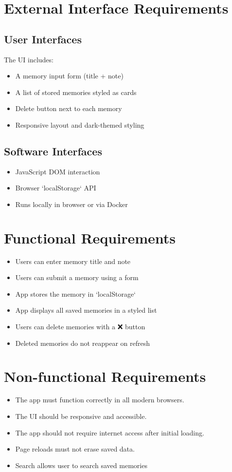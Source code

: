 \documentclass[12pt]{article}
\begin{document}
\section{External Interface Requirements}
\subsection*{User Interfaces}
The UI includes:
\begin{itemize}
    \item A memory input form (title + note)
    \item A list of stored memories styled as cards
    \item Delete button next to each memory
    \item Responsive layout and dark-themed styling
\end{itemize}

\subsection*{Software Interfaces}
\begin{itemize}
    \item JavaScript DOM interaction
    \item Browser `localStorage` API
    \item Runs locally in browser or via Docker
\end{itemize}

\section{Functional Requirements}
\begin{itemize}
    \item Users can enter memory title and note
    \item Users can submit a memory using a form
    \item App stores the memory in `localStorage`
    \item App displays all saved memories in a styled list
    \item Users can delete memories with a ❌ button
    \item Deleted memories do not reappear on refresh
\end{itemize}

\section{Non-functional Requirements}
\begin{itemize}
    \item The app must function correctly in all modern browsers.
    \item The UI should be responsive and accessible.
    \item The app should not require internet access after initial loading.
    \item Page reloads must not erase saved data.
    \item Search allows user to search saved memories
\end{itemize}
\end{document}
